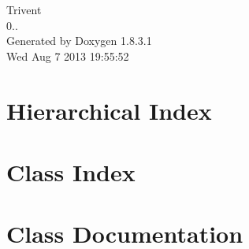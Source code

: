 \documentclass{book}
\begin{document}
\begin{titlepage}
\vspace*{7cm}
\begin{center}
{\Large Trivent \\[1ex]\large 0.. }\\
\vspace*{1cm}
{\large Generated by Doxygen 1.8.3.1}\\
\vspace*{0.5cm}
{\small Wed Aug 7 2013 19:55:52}\\
\end{center}
\end{titlepage}
\clearemptydoublepage
{}
\tableofcontents
\clearemptydoublepage
{}
\chapter{Hierarchical Index}

\chapter{Class Index}

\chapter{Class Documentation}















\printindex
\end{document}
